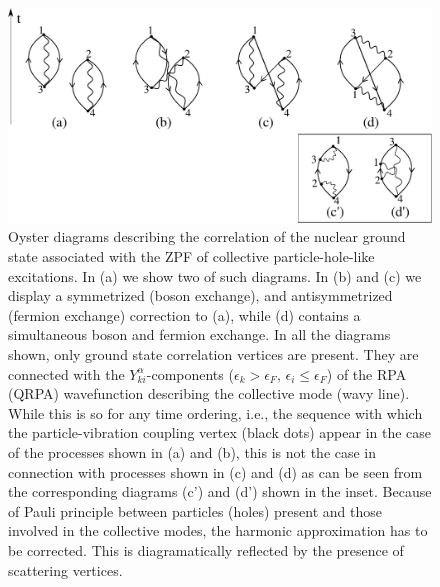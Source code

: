 \begin{figure}
\centerline {
\includegraphics*[width=12cm]{introduccion/figs/figintroA1}
}
\caption{Oyster diagrams describing the correlation of the nuclear ground state associated with the ZPF of  collective particle-hole-like excitations. In (a) we show two of such diagrams. In (b) and (c) we display a symmetrized (boson exchange), and antisymmetrized  (fermion exchange) correction to (a), while  (d) contains a simultaneous boson and fermion exchange. In all the diagrams shown, only ground state correlation vertices are present. They are connected with the $Y^\alpha_{ki}$-components ($\epsilon_k>\epsilon_F, \,\epsilon_i\le\epsilon_F$) of the RPA (QRPA) wavefunction describing the collective mode (wavy line). While this is so for any time ordering, i.e., the sequence with which the particle-vibration coupling vertex (black dots) appear in the case of the processes shown in (a) and (b), this is not the case in connection with processes shown in (c) and (d) as can be seen from the corresponding diagrams (c') and (d') shown in the inset. Because of Pauli principle between particles (holes) present and those involved in the collective modes, the harmonic approximation has to be corrected. This is diagramatically reflected by the presence of scattering vertices.}
\label{figintroA1}
\end{figure}
